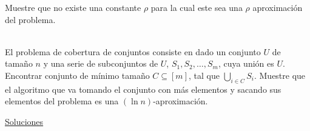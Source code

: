 \documentclass[dcc,uchile]{fcfmcourse}
\begin{document}
\begin{problems}
\begin{algorithm}[H]
\end{algorithm}
Muestre que no existe una constante $\rho$ para la cual este sea una $\rho$ aproximación del problema. 


\\
El problema de cobertura de conjuntos consiste en dado un conjunto $U$ de tamaño $n$ y una serie de subconjuntos de  $U$, $S_{1}, S_{2}, \ldots, S_{m}$, cuya unión es $U$. Encontrar conjunto de mínimo tamaño $C \subseteq [m]$, tal que $\bigcup\limits_{i \in C} S_{i}$. Muestre que el algoritmo que va tomando el conjunto con más elementos y sacando sus elementos del problema es una $(\ln n)$-aproximación.
\end{problems}

\newpage
\begin{center}
{\huge \underline{Soluciones}}
\end{center}
\end{document}
